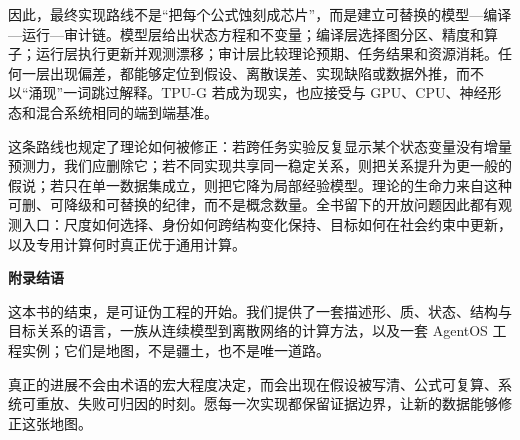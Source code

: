 因此，最终实现路线不是“把每个公式蚀刻成芯片”，而是建立可替换的模型—编译—运行—审计链。模型层给出状态方程和不变量；编译层选择图分区、精度和算子；运行层执行更新并观测漂移；审计层比较理论预期、任务结果和资源消耗。任何一层出现偏差，都能够定位到假设、离散误差、实现缺陷或数据外推，而不以“涌现”一词跳过解释。TPU-G 若成为现实，也应接受与 GPU、CPU、神经形态和混合系统相同的端到端基准。

这条路线也规定了理论如何被修正：若跨任务实验反复显示某个状态变量没有增量预测力，我们应删除它；若不同实现共享同一稳定关系，则把关系提升为更一般的假说；若只在单一数据集成立，则把它降为局部经验模型。理论的生命力来自这种可删、可降级和可替换的纪律，而不是概念数量。全书留下的开放问题因此都有观测入口：尺度如何选择、身份如何跨结构变化保持、目标如何在社会约束中更新，以及专用计算何时真正优于通用计算。

\begin{bquote}
\textbf{附录结语}

\vspace{1em}这本书的结束，是可证伪工程的开始。我们提供了一套描述形、质、状态、结构与目标关系的语言，一族从连续模型到离散网络的计算方法，以及一套 AgentOS 工程实例；它们是地图，不是疆土，也不是唯一道路。

\vspace{1em}真正的进展不会由术语的宏大程度决定，而会出现在假设被写清、公式可复算、系统可重放、失败可归因的时刻。愿每一次实现都保留证据边界，让新的数据能够修正这张地图。
\end{bquote}
